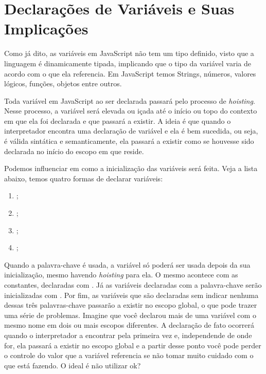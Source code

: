 \section{Declarações de Variáveis e Suas Implicações}

Como já dito, as variáveis em JavaScript não tem um tipo definido, visto que a linguagem é dinamicamente tipada, implicando que o tipo da variável varia de acordo com o que ela referencia. Em JavaScript temos Strings, números, valores lógicos, funções, objetos entre outros.

Toda variável em JavaScript ao ser declarada passará pelo processo de \textit{hoisting}. Nesse processo, a variável será elevada ou içada até o início ou topo do contexto em que ela foi declarada e que passará a existir. A ideia é que quando o interpretador encontra uma declaração de variável e ela é bem sucedida, ou seja, é válida sintática e semanticamente, ela passará a existir como se houvesse sido declarada no início do escopo em que reside.

Podemos influenciar em como a inicialização das variáveis será feita. Veja a lista abaixo, temos quatro formas de declarar variáveis:

\begin{enumerate}
    \item {};
    \item {};
    \item {};
    \item {};
\end{enumerate}

Quando a palavra-chave  é usada, a variável só poderá ser usada depois da sua inicialização, mesmo havendo \textit{hoisting} para ela. O mesmo acontece com as constantes, declaradas com . Já as variáveis declaradas com a palavra-chave  serão inicializadas com . Por fim, as variáveis que são declaradas sem indicar nenhuma dessas três palavras-chave passarão a existir no escopo global, o que pode trazer uma série de problemas. Imagine que você declarou mais de uma variável com o mesmo nome em dois ou mais escopos diferentes. A declaração de fato ocorrerá quando o interpretador a encontrar pela primeira vez e, independende de onde for, ela passará a existir no escopo global e a partir desse ponto você pode perder o controle do valor que a variável referencia se não tomar muito cuidado com o que está fazendo. O ideal é não utilizar ok?

